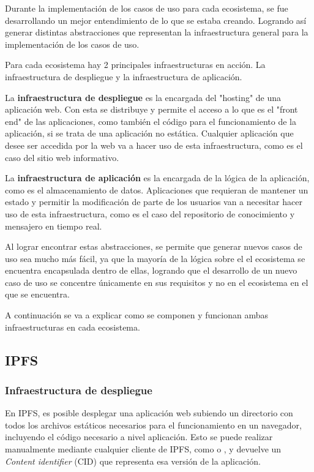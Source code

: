 Durante la implementación de los casos de uso para cada ecosistema, se fue desarrollando un mejor entendimiento de lo que se estaba creando. Logrando así generar distintas abstracciones que representan la infraestructura general para la implementación de los casos de uso.

Para cada ecosistema hay 2 principales infraestructuras en acción. La infraestructura de despliegue y la infraestructura de aplicación.

La \textbf{infraestructura de despliegue} es la encargada del "hosting" de una aplicación web. Con esta se distribuye y permite el acceso a lo que es el "front end" de las aplicaciones, como también el código para el funcionamiento de la aplicación, si se trata de una aplicación no estática. Cualquier aplicación que desee ser accedida por la web va a hacer uso de esta infraestructura, como es el caso del sitio web informativo.

La \textbf{infraestructura de aplicación} es la encargada de la lógica de la aplicación, como es el almacenamiento de datos. Aplicaciones que requieran de mantener un estado y permitir la modificación de parte de los usuarios van a necesitar hacer uso de esta infraestructura, como es el caso del repositorio de conocimiento y mensajero en tiempo real.

Al lograr encontrar estas abstracciones, se permite que generar nuevos casos de uso sea mucho más fácil, ya que la mayoría de la lógica sobre el el ecosistema se encuentra encapsulada dentro de ellas, logrando que el desarrollo de un nuevo caso de uso se concentre únicamente en sus requisitos y no en el ecosistema en el que se encuentra.

A continuación se va a explicar como se componen y funcionan ambas infraestructuras en cada ecosistema.

\subsection{IPFS}

\subsubsection{Infraestructura de despliegue}

En IPFS, es posible desplegar una aplicación web subiendo un directorio con todos los archivos estáticos necesarios para el funcionamiento en un navegador, incluyendo el código necesario a nivel aplicación. Esto se puede realizar manualmente mediante cualquier cliente de IPFS, como \cite{kubo} o \cite{helia}, y devuelve un \textit{Content identifier} (CID) \cite{cid} que representa esa versión de la aplicación.

